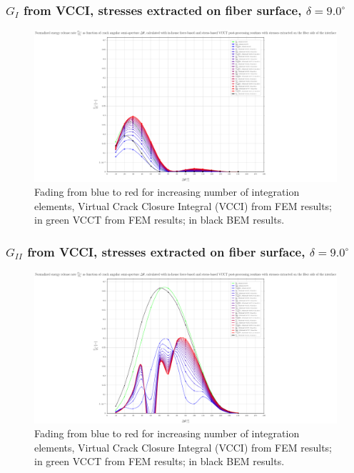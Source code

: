 \begin{frame}
\frametitle{\small $G_{I}$ from VCCI, stresses extracted on fiber surface, $\delta=9.0^{\circ}$}
\vspace{-0.75cm}
\centering
\captionsetup[figure]{font=scriptsize,labelfont=scriptsize}
\begin{figure}[!h]
\centering
\includegraphics[height=0.7\textheight]{2017-07-25_AbqRunSummary_SmallStrain_D09/pdf/2017-07-25_AbqRunSummary_SmallStrain_D09_F-SoF-VCCT_GI.pdf}
  \caption{\scriptsize Fading from blue to red for increasing number of integration elements, Virtual Crack Closure Integral (VCCI) from FEM results; in green VCCT from FEM results; in black BEM results.}
  \label{fig:res1}
\end{figure}
\end{frame}
\begin{frame}
\frametitle{\small $G_{II}$ from VCCI, stresses extracted on fiber surface, $\delta=9.0^{\circ}$}
\vspace{-0.75cm}
\centering
\captionsetup[figure]{font=scriptsize,labelfont=scriptsize}
\begin{figure}[!h]
\centering
\includegraphics[height=0.7\textheight]{2017-07-25_AbqRunSummary_SmallStrain_D09/pdf/2017-07-25_AbqRunSummary_SmallStrain_D09_F-SoF-VCCT_GII.pdf}
  \caption{\scriptsize Fading from blue to red for increasing number of integration elements, Virtual Crack Closure Integral (VCCI) from FEM results; in green VCCT from FEM results; in black BEM results.}
  \label{fig:res1}
\end{figure}
\end{frame}

